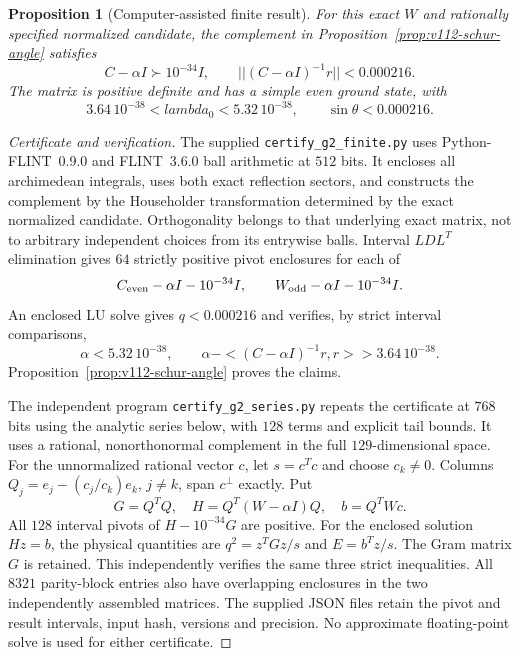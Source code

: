\documentclass[11pt]{article}
\def\lambda{lambda}%
\def\norm#1{||#1||}%
\def\ip#1#2{<#1,#2>}%
\newtheorem{proposition}[theorem]{Proposition}
\theoremstyle{remark}
\newcommand{\norm}[1]{\left\lVert #1\right\rVert}
\newcommand{\ip}[2]{\left\langle #1,#2\right\rangle}
\begin{document}
\begin{proposition}[Computer-assisted finite result]
\label{prop:v112-finite-certificate}
For this exact $W$ and rationally specified normalized candidate,
the complement in Proposition~\ref{prop:v112-schur-angle} satisfies
\[
 C-\alpha I\succ10^{-34}I,\qquad
 \norm{(C-\alpha I)^{-1}r}<0.000216.
\]
The matrix is positive definite and has a simple even ground state, with
\begin{equation}\label{eq:v112-certified-bottom}
 3.64\,10^{-38}<\lambda_0<5.32\,10^{-38},
 \qquad \sin\theta<0.000216.
\end{equation}
\end{proposition}
\begin{proof}[Certificate and verification]
The supplied \texttt{certify\_g2\_finite.py} uses
Python-FLINT~0.9.0 and FLINT~3.6.0 ball arithmetic
\cite{PythonFlint2026} at $512$ bits. It encloses all archimedean
integrals, uses both exact reflection sectors, and constructs the
complement by the Householder transformation determined by the exact
normalized candidate. Orthogonality belongs to that underlying exact
matrix, not to arbitrary independent choices from its entrywise balls.
Interval $LDL^T$ elimination gives $64$ strictly positive pivot
enclosures for each of
\[
 C_{\rm even}-\alpha I-10^{-34}I,
 \qquad W_{\rm odd}-\alpha I-10^{-34}I.
\]
An enclosed LU solve gives $q<0.000216$ and verifies, by strict
interval comparisons,
\[
 \alpha<5.32\,10^{-38},\qquad
 \alpha-\ip{(C-\alpha I)^{-1}r}{r}>3.64\,10^{-38}.
\]
Proposition~\ref{prop:v112-schur-angle} proves the claims.

The independent program \texttt{certify\_g2\_series.py} repeats the
certificate at $768$ bits using the analytic series below, with $128$
terms and explicit tail bounds. It uses a rational, nonorthonormal
complement in the full $129$-dimensional space. For the unnormalized
rational vector $c$, let $s=c^Tc$ and choose $c_k\ne0$. Columns
$Q_j=e_j-(c_j/c_k)e_k$, $j\ne k$, span $c^\perp$ exactly. Put
\[
 G=Q^TQ,\quad H=Q^T(W-\alpha I)Q,\quad b=Q^TWc.
\]
All $128$ interval pivots of $H-10^{-34}G$ are positive.
For the enclosed solution $Hz=b$, the physical quantities are
$q^2=z^TGz/s$ and $E=b^Tz/s$. The Gram matrix $G$ is retained.
This independently verifies the same three strict inequalities.
All $8321$ parity-block entries also have overlapping enclosures in the
two independently assembled matrices. The supplied JSON files retain
the pivot and result intervals, input hash, versions and precision.
No approximate floating-point solve is used for either certificate.
\end{proof}
\end{document}
